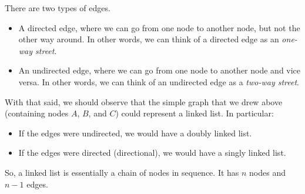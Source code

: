 \documentclass[letterpaper]{article}
\begin{document}
\bigskip 

There are two types of edges. 
\begin{itemize}
    \item A directed edge, where we can go from one node to another node, but not the other way around. In other words, we can think of a directed edge as an \emph{one-way street}. 
    \item An undirected edge, where we can go from one node to another node and vice versa. In other words, we can think of an undirected edge as a \emph{two-way street}. 
\end{itemize}

With that said, we should observe that the simple graph that we drew above (containing nodes $A$, $B$, and $C$) could represent a linked list. In particular: 
\begin{itemize}
    \item If the edges were undirected, we would have a doubly linked list. 
    \item If the edges were directed (directional), we would have a singly linked list. 
\end{itemize}
So, a linked list is essentially a chain of nodes in sequence. It has $n$ nodes and $n - 1$ edges. 
\end{document}
